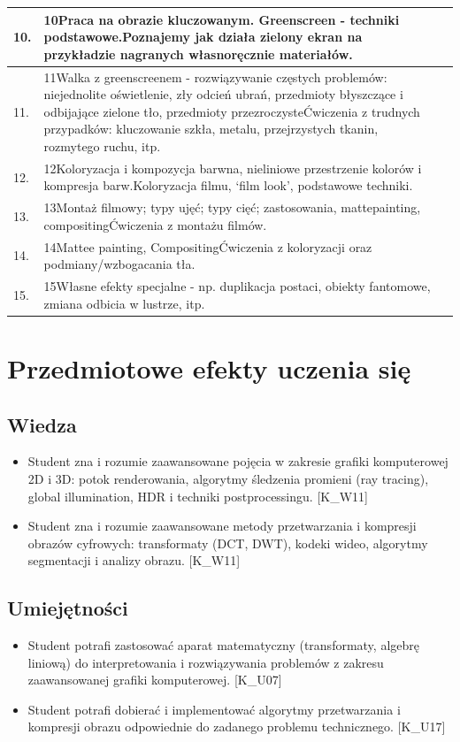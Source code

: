 \documentclass[12pt, a4paper]{article}
\begin{document}
\begin{longtable}{|p{1.5cm}|p{6.5cm}|p{6.5cm}|}
  \hline
  10. & 10Praca na obrazie kluczowanym. Greenscreen - techniki podstawowe.Poznajemy jak działa zielony ekran na przykładzie nagranych własnoręcznie materiałów. &  \\
  \hline
  11. & 11Walka z greenscreenem - rozwiązywanie częstych problemów: niejednolite oświetlenie, zły odcień ubrań, przedmioty błyszczące i odbijające zielone tło, przedmioty przezroczysteĆwiczenia z trudnych przypadków: kluczowanie szkła, metalu, przejrzystych tkanin, rozmytego ruchu, itp. &  \\
  \hline
  12. & 12Koloryzacja i kompozycja barwna, nieliniowe przestrzenie kolorów i kompresja barw.Koloryzacja filmu, ‘film look’, podstawowe techniki. &  \\
  \hline
  13. & 13Montaż filmowy; typy ujęć; typy cięć; zastosowania, mattepainting, compositingĆwiczenia z montażu filmów. &  \\
  \hline
  14. & 14Mattee painting, CompositingĆwiczenia z koloryzacji oraz podmiany/wzbogacania tła. &  \\
  \hline
  15. & 15Własne efekty specjalne - np. duplikacja postaci, obiekty fantomowe, zmiana odbicia w lustrze, itp. &  \\
  \hline
\end{longtable}

\section{Przedmiotowe efekty uczenia się}

\subsection*{Wiedza}
\begin{itemize}
  \item Student zna i rozumie zaawansowane pojęcia w zakresie grafiki komputerowej 2D i 3D: potok renderowania, algorytmy śledzenia promieni (ray tracing), global illumination, HDR i techniki postprocessingu. [K\_W11]
  \item Student zna i rozumie zaawansowane metody przetwarzania i kompresji obrazów cyfrowych: transformaty (DCT, DWT), kodeki wideo, algorytmy segmentacji i analizy obrazu. [K\_W11]
\end{itemize}

\subsection*{Umiejętności}
\begin{itemize}
  \item Student potrafi zastosować aparat matematyczny (transformaty, algebrę liniową) do interpretowania i rozwiązywania problemów z zakresu zaawansowanej grafiki komputerowej. [K\_U07]
  \item Student potrafi dobierać i implementować algorytmy przetwarzania i kompresji obrazu odpowiednie do zadanego problemu technicznego. [K\_U17]
\end{itemize}
\end{document}
